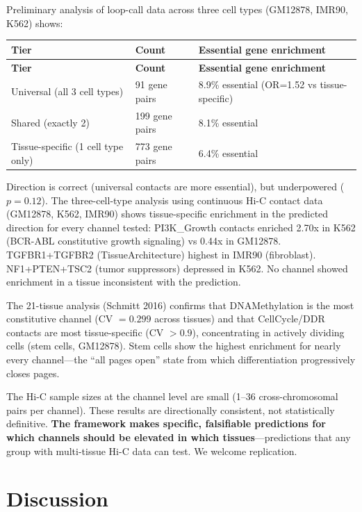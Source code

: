\documentclass[11pt]{article}
\theoremstyle{definition}
\begin{document}
Preliminary analysis of loop-call data across three cell types (GM12878, IMR90, K562) shows:

\begin{longtable}{p{4cm} p{2.5cm} p{6cm}}
\toprule
\textbf{Tier} & \textbf{Count} & \textbf{Essential gene enrichment} \\
\midrule
\endfirsthead
\toprule
\textbf{Tier} & \textbf{Count} & \textbf{Essential gene enrichment} \\
\midrule
\endhead
Universal (all 3 cell types) & 91 gene pairs & 8.9\% essential (OR=1.52 vs tissue-specific) \\
Shared (exactly 2) & 199 gene pairs & 8.1\% essential \\
Tissue-specific (1 cell type only) & 773 gene pairs & 6.4\% essential \\
\bottomrule
\end{longtable}

Direction is correct (universal contacts are more essential), but underpowered ($p=0.12$). The three-cell-type analysis using continuous Hi-C contact data (GM12878, K562, IMR90) shows tissue-specific enrichment in the predicted direction for every channel tested: PI3K\_Growth contacts enriched 2.70x in K562 (BCR-ABL constitutive growth signaling) vs 0.44x in GM12878. TGFBR1+TGFBR2 (TissueArchitecture) highest in IMR90 (fibroblast). NF1+PTEN+TSC2 (tumor suppressors) depressed in K562. No channel showed enrichment in a tissue inconsistent with the prediction.

The 21-tissue analysis (Schmitt 2016) confirms that DNAMethylation is the most constitutive channel (CV $= 0.299$ across tissues) and that CellCycle/DDR contacts are most tissue-specific (CV $> 0.9$), concentrating in actively dividing cells (stem cells, GM12878). Stem cells show the highest enrichment for nearly every channel---the ``all pages open'' state from which differentiation progressively closes pages.

The Hi-C sample sizes at the channel level are small (1--36 cross-chromosomal pairs per channel). These results are directionally consistent, not statistically definitive. \textbf{The framework makes specific, falsifiable predictions for which channels should be elevated in which tissues}---predictions that any group with multi-tissue Hi-C data can test. We welcome replication.

\section{Discussion}
\end{document}
